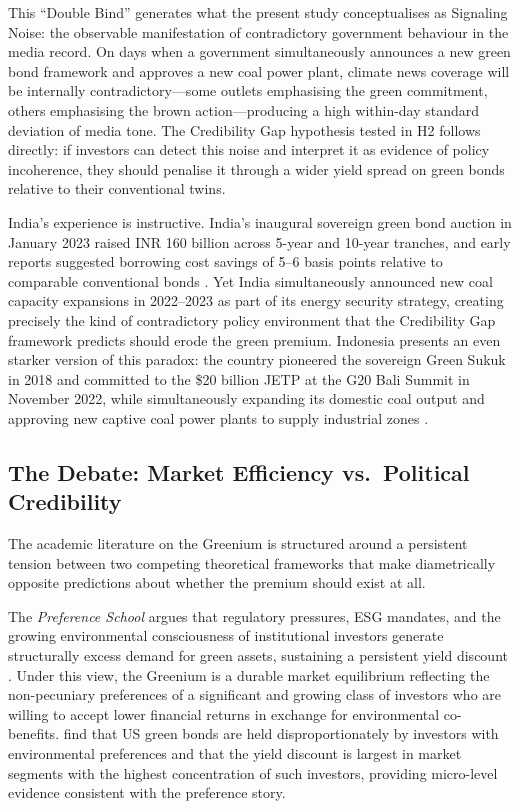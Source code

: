 \documentclass[12pt,a4paper]{article}
\begin{document}
This ``Double Bind'' generates what the present study conceptualises as Signaling Noise: the observable manifestation of contradictory government behaviour in the media record. On days when a government simultaneously announces a new green bond framework and approves a new coal power plant, climate news coverage will be internally contradictory---some outlets emphasising the green commitment, others emphasising the brown action---producing a high within-day standard deviation of media tone. The Credibility Gap hypothesis tested in H2 follows directly: if investors can detect this noise and interpret it as evidence of policy incoherence, they should penalise it through a wider yield spread on green bonds relative to their conventional twins.

India's experience is instructive. India's inaugural sovereign green bond auction in January 2023 raised INR 160 billion across 5-year and 10-year tranches, and early reports suggested borrowing cost savings of 5--6 basis points relative to comparable conventional bonds \citep{Panizza2025}. Yet India simultaneously announced new coal capacity expansions in 2022--2023 as part of its energy security strategy, creating precisely the kind of contradictory policy environment that the Credibility Gap framework predicts should erode the green premium. Indonesia presents an even starker version of this paradox: the country pioneered the sovereign Green Sukuk in 2018 and committed to the \$20 billion JETP at the G20 Bali Summit in November 2022, while simultaneously expanding its domestic coal output and approving new captive coal power plants to supply industrial zones \citep{Neumann2025}.


\subsection{The Debate: Market Efficiency vs.\ Political Credibility}

The academic literature on the Greenium is structured around a persistent tension between two competing theoretical frameworks that make diametrically opposite predictions about whether the premium should exist at all.

The \textit{Preference School} argues that regulatory pressures, ESG mandates, and the growing environmental consciousness of institutional investors generate structurally excess demand for green assets, sustaining a persistent yield discount \citep{Baker2022, Flammer2021}. Under this view, the Greenium is a durable market equilibrium reflecting the non-pecuniary preferences of a significant and growing class of investors who are willing to accept lower financial returns in exchange for environmental co-benefits. \citet{Baker2022} find that US green bonds are held disproportionately by investors with environmental preferences and that the yield discount is largest in market segments with the highest concentration of such investors, providing micro-level evidence consistent with the preference story.
\end{document}
